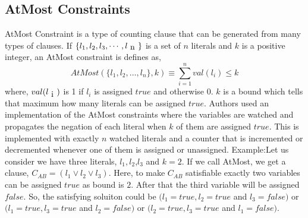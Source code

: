 \subsection{AtMost Constraints}
AtMost Constraint is a type of counting clause that can be generated from many types of clauses. If $\{l_{1}, l_{2}, l_{3},\cdots ,l_{\text n}\}$ is a set of $n$ literals and $k$ is a positive integer, an AtMost constraint is defines as,\newline
$$AtMost(\{l_{1},l_{2},\ldots,l_{n}\},k)\equiv \sum\limits^{n}_{i=1} val(l_{i})\leqslant k$$
where, $val(l_{\text i})$ is 1 if $l_{i}$ is assigned $true$ and otherwise 0. $k$ is a bound which tells that maximum how many literals can be assigned $true$.\newline
Authors used an implementation of the AtMost constraints where the variables are watched and propagates the negation of each literal when $k$ of them are assigned $true$. This is implemented with exactly $n$ watched literals and a counter that is incremented or decremented whenever one of them is assigned or unassigned.\newline
Example:Let us consider we have three literals, $l_{1}, l_{2}$,$l_{3}$ and $k=2$. If we call AtMost, we get a clause, $C_{AB}=(l_{1}\vee l_{2}\vee l_{3})$. Here, to make $C_{AB}$ satisfiable exactly two variables can be assigned $true$ as bound is $2$. After that the third variable will be assigned $false$. So, the satisfying soluiton could be $(l_{1}=true, l_{2}=true$ and $l_{3}=false)$ or $(l_{1}=true, l_{3}=true$ and $l_{2}=false)$ or $(l_{2}=true, l_{3}=true$ and $l_{1}=false)$.
